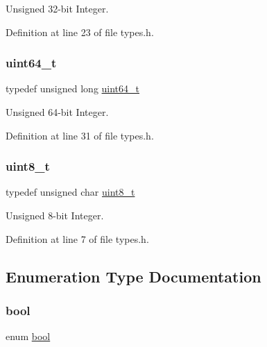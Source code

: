 Unsigned 32-\/bit Integer. 



Definition at line 23 of file types.\+h.

\mbox{\label{a00134_aa232ecf786a74ce5363c36c10798d2b1_aa232ecf786a74ce5363c36c10798d2b1}} 
\subsubsection{\texorpdfstring{uint64\+\_\+t}{uint64\_t}}
{\footnotesize\ttfamily typedef unsigned long \hyperlink{a00134_aa232ecf786a74ce5363c36c10798d2b1_aa232ecf786a74ce5363c36c10798d2b1}{uint64\+\_\+t}}



Unsigned 64-\/bit Integer. 



Definition at line 31 of file types.\+h.

\mbox{\label{a00134_aba7bc1797add20fe3efdf37ced1182c5_aba7bc1797add20fe3efdf37ced1182c5}} 
\subsubsection{\texorpdfstring{uint8\+\_\+t}{uint8\_t}}
{\footnotesize\ttfamily typedef unsigned char \hyperlink{a00134_aba7bc1797add20fe3efdf37ced1182c5_aba7bc1797add20fe3efdf37ced1182c5}{uint8\+\_\+t}}



Unsigned 8-\/bit Integer. 



Definition at line 7 of file types.\+h.



\subsection{Enumeration Type Documentation}
\mbox{\label{a00134_af6a258d8f3ee5206d682d799316314b1_af6a258d8f3ee5206d682d799316314b1}} 
\subsubsection{\texorpdfstring{bool}{bool}}
{\footnotesize\ttfamily enum \hyperlink{a00134_af6a258d8f3ee5206d682d799316314b1_af6a258d8f3ee5206d682d799316314b1}{bool}}




